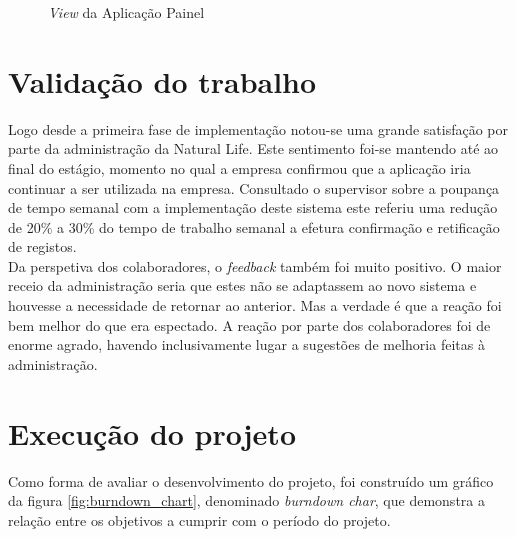 \begin{figure}[H]
	\caption{\textit{View} da Aplicação Painel}
	\label{fig:comparacao_painel}
\end{figure}

\section{Validação do trabalho}
Logo desde a primeira fase de implementação notou-se uma grande satisfação por parte da administração da Natural Life. Este sentimento foi-se mantendo até ao final do estágio, momento no qual a empresa confirmou que a aplicação iria continuar a ser utilizada na empresa. Consultado o supervisor sobre a poupança de tempo semanal com a implementação deste sistema este referiu uma redução de 20\% a 30\% do tempo de trabalho semanal a efetura confirmação e retificação de registos.\\
Da perspetiva dos colaboradores, o \textit{feedback} também foi muito positivo. O maior receio da administração seria que estes não se adaptassem ao novo sistema e houvesse a necessidade de retornar ao anterior. Mas a verdade é que a reação foi bem melhor do que era espectado. A reação por parte dos colaboradores foi de enorme agrado, havendo inclusivamente lugar a sugestões de melhoria feitas à administração.

\section{Execução do projeto} 
Como forma de avaliar o desenvolvimento do projeto, foi construído um gráfico da figura \ref{fig:burndown_chart}, denominado \textit{burndown char}, que demonstra a relação entre os objetivos a cumprir com o período do projeto.

